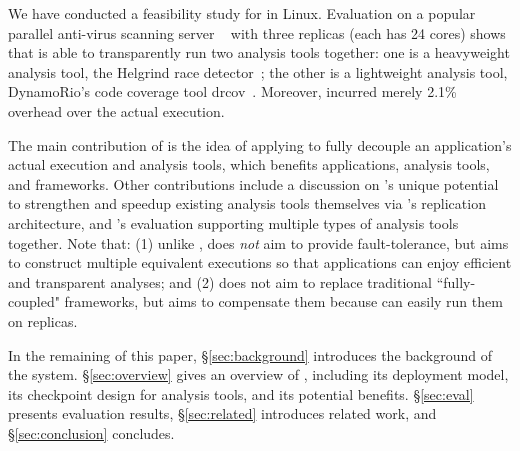 We have conducted a feasibility study for \xxx in Linux. Evaluation on a 
popular parallel anti-virus scanning server \clamav~\cite{clamav} with three 
replicas (each has 24 cores) shows that \xxx is able to transparently run two 
analysis tools together: one is a heavyweight analysis tool, the Helgrind race 
detector~\cite{valgrind:pldi}; the other is a lightweight analysis tool, 
DynamoRio's code coverage tool drcov~\cite{dynamorio}. Moreover, \xxx incurred 
merely 2.1\% overhead over the actual execution.


The main contribution of \xxx is the idea of applying \tsmr to fully decouple 
an application's actual execution and analysis tools, which benefits 
applications, analysis tools, and frameworks. Other contributions include a 
discussion on \xxx's unique potential to strengthen and speedup existing 
analysis tools themselves via \xxx's replication architecture, and \xxx's 
evaluation supporting multiple types of analysis tools together. Note that: (1) unlike 
\repbox, \xxx does \emph{not} aim to provide fault-tolerance, but aims to 
construct multiple equivalent executions so that applications can enjoy 
efficient and transparent analyses; and (2) \xxx does not aim to replace 
traditional ``fully-coupled" frameworks, but aims to compensate them because \xxx 
can easily run them on replicas.


In the remaining of this paper, \S\ref{sec:background} introduces the 
background of the \repbox system. \S\ref{sec:overview} gives an overview of 
\xxx, including its deployment model, its checkpoint design for analysis 
tools, and its potential benefits. \S\ref{sec:eval} presents evaluation 
results, \S\ref{sec:related} introduces related work, and 
\S\ref{sec:conclusion} concludes.